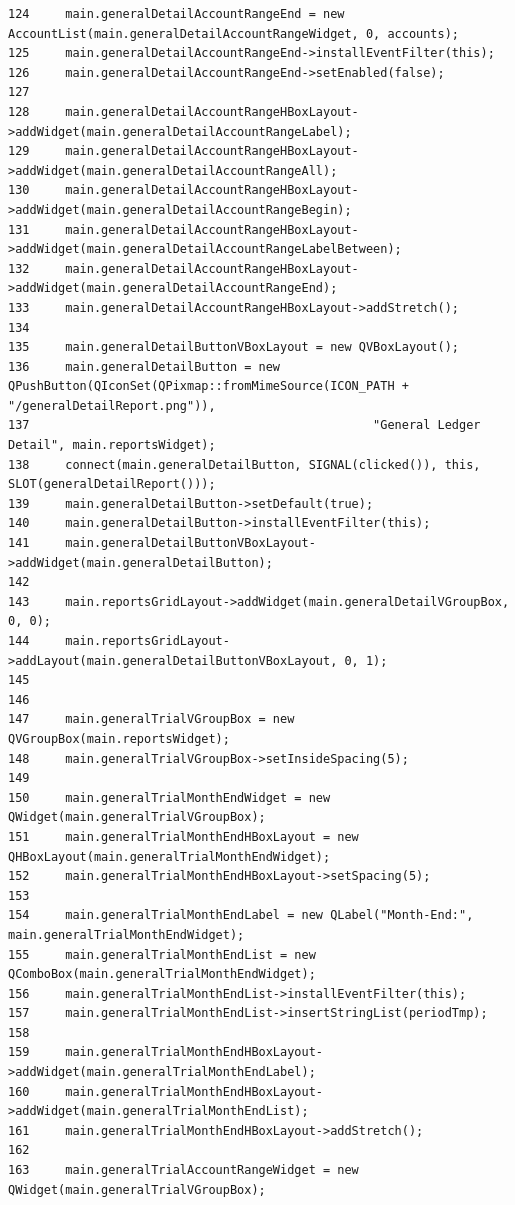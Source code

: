 \begin{verbatim}
124     main.generalDetailAccountRangeEnd = new AccountList(main.generalDetailAccountRangeWidget, 0, accounts);
125     main.generalDetailAccountRangeEnd->installEventFilter(this);
126     main.generalDetailAccountRangeEnd->setEnabled(false);
127 
128     main.generalDetailAccountRangeHBoxLayout->addWidget(main.generalDetailAccountRangeLabel);    
129     main.generalDetailAccountRangeHBoxLayout->addWidget(main.generalDetailAccountRangeAll);
130     main.generalDetailAccountRangeHBoxLayout->addWidget(main.generalDetailAccountRangeBegin);
131     main.generalDetailAccountRangeHBoxLayout->addWidget(main.generalDetailAccountRangeLabelBetween);
132     main.generalDetailAccountRangeHBoxLayout->addWidget(main.generalDetailAccountRangeEnd);
133     main.generalDetailAccountRangeHBoxLayout->addStretch();
134     
135     main.generalDetailButtonVBoxLayout = new QVBoxLayout();
136     main.generalDetailButton = new QPushButton(QIconSet(QPixmap::fromMimeSource(ICON_PATH + "/generalDetailReport.png")),
137                                                "General Ledger Detail", main.reportsWidget);
138     connect(main.generalDetailButton, SIGNAL(clicked()), this, SLOT(generalDetailReport()));
139     main.generalDetailButton->setDefault(true);
140     main.generalDetailButton->installEventFilter(this);
141     main.generalDetailButtonVBoxLayout->addWidget(main.generalDetailButton);
142     
143     main.reportsGridLayout->addWidget(main.generalDetailVGroupBox, 0, 0);
144     main.reportsGridLayout->addLayout(main.generalDetailButtonVBoxLayout, 0, 1);
145     
146     
147     main.generalTrialVGroupBox = new QVGroupBox(main.reportsWidget);
148     main.generalTrialVGroupBox->setInsideSpacing(5);
149     
150     main.generalTrialMonthEndWidget = new QWidget(main.generalTrialVGroupBox);
151     main.generalTrialMonthEndHBoxLayout = new QHBoxLayout(main.generalTrialMonthEndWidget);
152     main.generalTrialMonthEndHBoxLayout->setSpacing(5);
153     
154     main.generalTrialMonthEndLabel = new QLabel("Month-End:", main.generalTrialMonthEndWidget);
155     main.generalTrialMonthEndList = new QComboBox(main.generalTrialMonthEndWidget);
156     main.generalTrialMonthEndList->installEventFilter(this);
157     main.generalTrialMonthEndList->insertStringList(periodTmp);
158     
159     main.generalTrialMonthEndHBoxLayout->addWidget(main.generalTrialMonthEndLabel);
160     main.generalTrialMonthEndHBoxLayout->addWidget(main.generalTrialMonthEndList);
161     main.generalTrialMonthEndHBoxLayout->addStretch();
162     
163     main.generalTrialAccountRangeWidget = new QWidget(main.generalTrialVGroupBox);

\end{verbatim}
